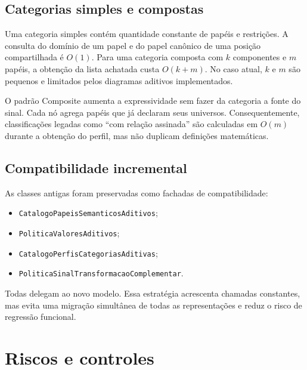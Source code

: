 \documentclass[12pt,a4paper]{article}
\begin{document}
\subsection{Categorias simples e compostas}

Uma categoria simples contém quantidade constante de papéis e restrições. A consulta do domínio de um papel e do papel canônico de uma posição compartilhada é $O(1)$. Para uma categoria composta com $k$ componentes e $m$ papéis, a obtenção da lista achatada custa $O(k+m)$. No caso atual, $k$ e $m$ são pequenos e limitados pelos diagramas aditivos implementados.

O padrão Composite aumenta a expressividade sem fazer da categoria a fonte do sinal. Cada nó agrega papéis que já declaram seus universos. Consequentemente, classificações legadas como ``com relação assinada'' são calculadas em $O(m)$ durante a obtenção do perfil, mas não duplicam definições matemáticas.

\subsection{Compatibilidade incremental}

As classes antigas foram preservadas como fachadas de compatibilidade:
\begin{itemize}[noitemsep]
  \item \texttt{CatalogoPapeisSemanticosAditivos};
  \item \texttt{PoliticaValoresAditivos};
  \item \texttt{CatalogoPerfisCategoriasAditivas};
  \item \texttt{PoliticaSinalTransformacaoComplementar}.
\end{itemize}
Todas delegam ao novo modelo. Essa estratégia acrescenta chamadas constantes, mas evita uma migração simultânea de todas as representações e reduz o risco de regressão funcional.

\section{Riscos e controles}
\end{document}
